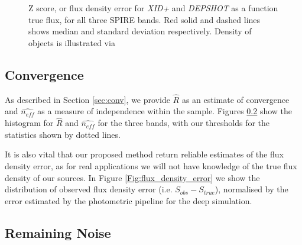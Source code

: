 \documentclass[useAMS,usenatbib]{mnras}
\begin{document}
\begin{figure}
\caption{Z score, or flux density error for \emph{XID+} and \emph{DEPSHOT} as a function true flux, for all three SPIRE bands. Red solid and dashed lines shows median and standard deviation respectively. Density of objects is illustrated via }\label{fig:zscore}
\end{figure}

\subsection{Convergence}
As described in Section \ref{sec:conv}, we provide $\hat{R}$ as an estimate of convergence and $\hat{n_{eff}}$ as a measure of independence within the sample. Figures \ref{} show the histogram for $\hat{R}$ and $\hat{n_{eff}}$ for the three bands, with our thresholds for the statistics shown by dotted lines. 

It is also vital that our proposed method return reliable estimates of the flux density error, as for real applications we will not have knowledge of the true flux density of our sources. In Figure \ref{Fig:flux_density_error} we show the distribution of observed flux density error (i.e. $S_{obs}-S_{true}$), normalised by the error estimated by the photometric pipeline for the deep simulation. 


\subsection{Remaining Noise}
 
\end{document}
